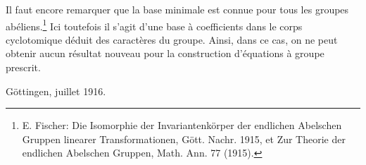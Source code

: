 Il faut encore remarquer que la base minimale est connue pour tous les groupes abéliens.\footnote{E. Fischer: \og{}Die Isomorphie der Invariantenkörper der endlichen Abelschen Gruppen linearer Transformationen\fg{}, Gött. Nachr. 1915, et \og{}Zur Theorie der endlichen Abelschen Gruppen\fg{}, Math. Ann. 77 (1915).} Ici toutefois il s'agit d'une base à coefficients dans le corps cyclotomique déduit des caractères du groupe. Ainsi, dans ce cas, on ne peut obtenir aucun résultat nouveau pour la construction d'équations à groupe prescrit.

\medskip
\noindent Göttingen, juillet 1916.
